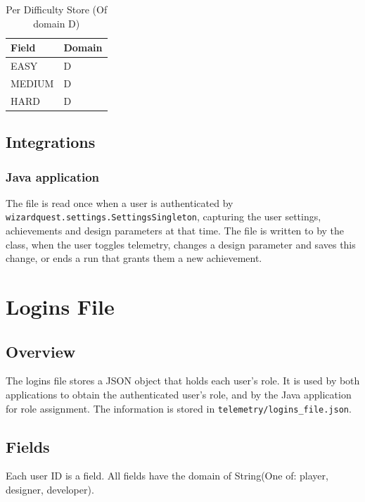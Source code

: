 \documentclass[11pt]{article}
\begin{document}
\begin{table}[H]
  \begin{center}
    \begin{tabularx}{\textwidth}{
        | >{\centering\arraybackslash\hsize=0.4\hsize}X
      | >{\centering\arraybackslash\hsize=0.6\hsize}X |}
      \hline
      \textbf{Field} & \textbf{Domain} \\
      \hline
      EASY & D \\
      \hline
      MEDIUM & D\\
      \hline
      HARD & D \\
      \hline
    \end{tabularx}
    \caption{Per Difficulty Store (Of domain D)}
    \label{tab:per_difficulty_store}
  \end{center}
\end{table}
\subsection{Integrations}
\subsubsection{Java application}
The file is read once when a user is authenticated by \verb|wizardquest.settings.SettingsSingleton|, capturing the user settings, achievements and design parameters at that time. The file is written to by the class, when the user toggles telemetry, changes a design parameter and saves this change, or ends a run that grants them a new achievement.

\section{Logins File}

\subsection{Overview}
The logins file stores a JSON object that holds each user's role. It is used by both applications to obtain the authenticated user's role, and by the Java application for role assignment. The information is stored in \verb|telemetry/logins_file.json|.

\subsection{Fields}
Each user ID is a field. All fields have the domain of String(One of: player, designer, developer).
\end{document}
